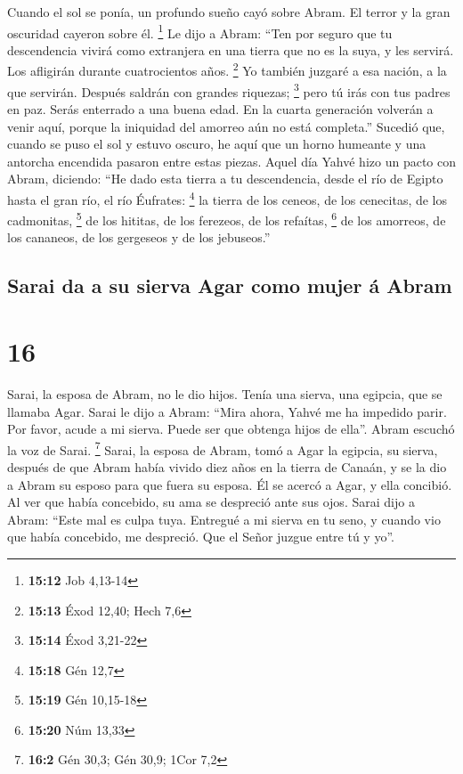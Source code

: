  Cuando el sol se ponía, un profundo sueño cayó sobre
Abram. El terror y la gran oscuridad cayeron sobre él. \footnote{\textbf{15:12}
  Job 4,13-14}  Le dijo a Abram: ``Ten por seguro que tu
descendencia vivirá como extranjera en una tierra que no es la suya, y
les servirá. Los afligirán durante cuatrocientos años. \footnote{\textbf{15:13}
  Éxod 12,40; Hech 7,6}  Yo también juzgaré a esa nación,
a la que servirán. Después saldrán con grandes riquezas; \footnote{\textbf{15:14}
  Éxod 3,21-22}  pero tú irás con tus padres en paz.
Serás enterrado a una buena edad.  En la cuarta
generación volverán a venir aquí, porque la iniquidad del amorreo aún no
está completa.''  Sucedió que, cuando se puso el sol y
estuvo oscuro, he aquí que un horno humeante y una antorcha encendida
pasaron entre estas piezas.  Aquel día Yahvé hizo un
pacto con Abram, diciendo: ``He dado esta tierra a tu descendencia,
desde el río de Egipto hasta el gran río, el río Éufrates: \footnote{\textbf{15:18}
  Gén 12,7}  la tierra de los ceneos, de los cenecitas,
de los cadmonitas, \footnote{\textbf{15:19} Gén 10,15-18}
 de los hititas, de los ferezeos, de los refaítas,
\footnote{\textbf{15:20} Núm 13,33}  de los amorreos, de
los cananeos, de los gergeseos y de los jebuseos.''

\hypertarget{sarai-da-a-su-sierva-agar-como-mujer-uxe1-abram}{%
\subsection{Sarai da a su sierva Agar como mujer á
Abram}\label{sarai-da-a-su-sierva-agar-como-mujer-uxe1-abram}}

\hypertarget{section-15}{%
\section{16}\label{section-15}}

 Sarai, la esposa de Abram, no le dio hijos. Tenía una
sierva, una egipcia, que se llamaba Agar.  Sarai le dijo a
Abram: ``Mira ahora, Yahvé me ha impedido parir. Por favor, acude a mi
sierva. Puede ser que obtenga hijos de ella''. Abram escuchó la voz de
Sarai. \footnote{\textbf{16:2} Gén 30,3; Gén 30,9; 1Cor 7,2}
 Sarai, la esposa de Abram, tomó a Agar la egipcia, su
sierva, después de que Abram había vivido diez años en la tierra de
Canaán, y se la dio a Abram su esposo para que fuera su esposa.
 Él se acercó a Agar, y ella concibió. Al ver que había
concebido, su ama se despreció ante sus ojos.  Sarai dijo
a Abram: ``Este mal es culpa tuya. Entregué a mi sierva en tu seno, y
cuando vio que había concebido, me despreció. Que el Señor juzgue entre
tú y yo''.

